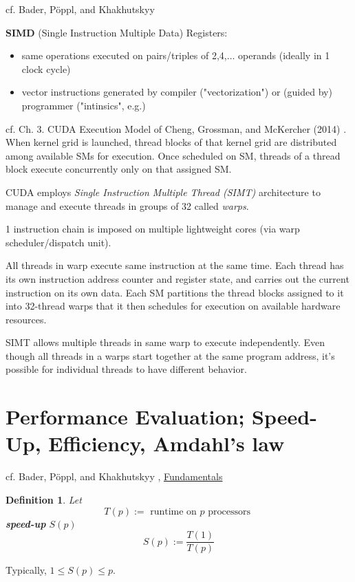\documentclass[10pt]{amsart}
\newtheorem{definition}{Definition}
\begin{document}
\begin{multicols*}{2}
cf. Bader, P\"{o}ppl, and Khakhutskyy \cite{BaPK2016}  

\textbf{SIMD} (Single Instruction Multiple Data) Registers: 
\begin{itemize}
	\item same operations executed on pairs/triples of 2,4,$\dots$ operands (ideally in 1 clock cycle)
	\item vector instructions generated by compiler ("vectorization") or (guided by) programmer ("intinsics", e.g.)
\end{itemize} 

cf. Ch. 3.  CUDA Execution Model of Cheng, Grossman, and McKercher (2014) \cite{CGM2014}.  
When kernel grid is launched, thread blocks of that kernel grid are distributed among available SMs for execution.  Once scheduled on SM, threads of a thread block execute concurrently only on that assigned SM.  

CUDA employs \emph{Single Instruction Multiple Thread (SIMT)} architecture to manage and execute threads in groups of 32 called \emph{warps}.  

1 instruction chain is imposed on multiple lightweight cores (via warp scheduler/dispatch unit)\cite{BaPK2016}.  

All threads in warp execute same instruction at the same time.  Each thread has its own instruction address counter and register state, and carries out the current instruction on its own data.  Each SM partitions the thread blocks assigned to it into 32-thread warps that it then schedules for execution on available hardware resources.  

SIMT allows multiple threads in same warp to execute independently.  Even though all threads in a warps start together at the same program address, it's possible for individual threads to have different behavior.  

\section{Performance Evaluation; Speed-Up, Efficiency, Amdahl's law}
cf. Bader, P\"{o}ppl, and Khakhutskyy \cite{BaPK2016}, \href{https://www5.in.tum.de/lehre/vorlesungen/hpc/WS16/fundamentals.pdf}{Fundamentals}
\begin{definition}
	Let
	\begin{equation}
	T(p):= \text{ runtime on $p$ processors }
	\end{equation}
	\textbf{speed-up} $S(p)$
	\begin{equation}
	S(p):= \frac{T(1)}{T(p)}
	\end{equation}
\end{definition}
Typically, $1\leq S(p) \leq p$.  


\end{multicols*}
\end{document}
